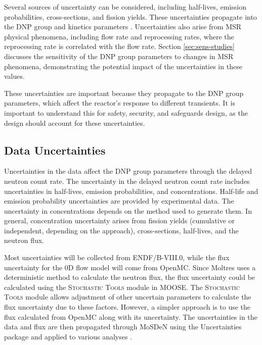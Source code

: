 Several sources of uncertainty can be considered, including half-lives, emission probabilities, cross-sections, and fission yields.
These uncertainties propagate into the \gls{DNP} group and kinetics parameters \cite{radaideh2019new}.
Uncertainties also arise from \gls{MSR} physical phenomena, including flow rate and reprocessing rates, where the reprocessing rate is correlated with the flow rate.
Section \ref{sec:sens-studies} discusses the sensitivity of the \gls{DNP} group parameters to changes in \gls{MSR} phenomena, demonstrating the potential impact of the uncertainties in these values.

These uncertainties are important because they propagate to the \gls{DNP} group parameters, which affect the reactor's response to different transients.
It is important to understand this for safety, security, and safeguards design, as the design should account for these uncertainties.

\subsection{Data Uncertainties}
Uncertainties in the data affect the \gls{DNP} group parameters through the delayed neutron count rate.
The uncertainty in the delayed neutron count rate includes uncertainties in half-lives, emission probabilities, and concentrations.
Half-life and emission probability uncertainties are provided by experimental data.
The uncertainty in concentrations depends on the method used to generate them.
In general, concentration uncertainty arises from fission yields (cumulative or independent, depending on the approach), cross-sections, half-lives, and the neutron flux.

Most uncertainties will be collected from \gls{ENDF}/B-VIII.0, while the flux uncertainty for the 0D flow model will come from OpenMC.
Since Moltres uses a deterministic method to calculate the neutron flux, the flux uncertainty could be calculated using the \textsc{Stochastic Tools} module in \gls{MOOSE}.
The \textsc{Stochastic Tools} module allows adjustment of other uncertain parameters to calculate the flux uncertainty due to these factors.
However, a simpler approach is to use the flux calculated from OpenMC along with its uncertainty. 
The uncertainties in the data and flux are then propagated through \gls{MoSDeN} using the Uncertainties package and applied to various analyses \cite{uncertaintiespackage}.

